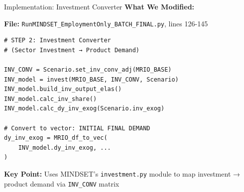 \documentclass[10pt]{beamer}
\begin{document}
\begin{frame}[fragile]{Implementation: Investment Converter}
\textbf{What We Modified:}

\vspace{0.3cm}

\textbf{File:} \texttt{RunMINDSET\_EmploymentOnly\_BATCH\_FINAL.py}, lines 126-145

\vspace{0.2cm}

\begin{verbatim}
# STEP 2: Investment Converter
# (Sector Investment → Product Demand)

INV_CONV = Scenario.set_inv_conv_adj(MRIO_BASE)
INV_model = invest(MRIO_BASE, INV_CONV, Scenario)
INV_model.build_inv_output_elas()
INV_model.calc_inv_share()
INV_model.calc_dy_inv_exog(Scenario.inv_exog)

# Convert to vector: INITIAL FINAL DEMAND
dy_inv_exog = MRIO_df_to_vec(
    INV_model.dy_inv_exog, ...
)
\end{verbatim}

\vspace{0.3cm}

\textbf{Key Point:} Uses MINDSET's \texttt{investment.py} module to map investment → product demand via \texttt{INV\_CONV} matrix

\end{frame}
\end{document}
